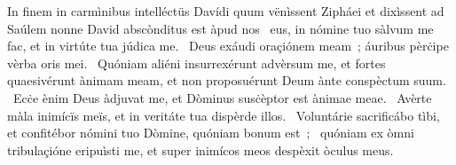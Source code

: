 { In finem in carmìnibus intelléctüs Davídi  quum vënìssent Zipháei et dixìssent ad Saúlem nonne David abscònditus est àpud nos}
{%
~eus, in nómine tuo sàlvum me fac, et in virtúte tua júdica me. 
~Deus exáudi oraçiónem meam~; áuribus pèrċipe vèrba oris mei. 
~Quóniam aliéni insurrexérunt advèrsum me, et fortes quaesivérunt ànimam meam, et non proposuérunt Deum ànte conspèctum suum. 
~Ecċe ènim Deus àdjuvat me, et Dòminus susċèptor est ànimae meae. 
~Avèrte màla inimícïs meïs, et in veritáte tua dispèrde illos. 
~Voluntárie sacrificábo tìbi, et confitébor nómini tuo Dòmine, quóniam bonum est~; 
~quóniam ex òmni tribulaçióne eripuìsti me, et super inimícos meos despèxit òculus meus. 
}
